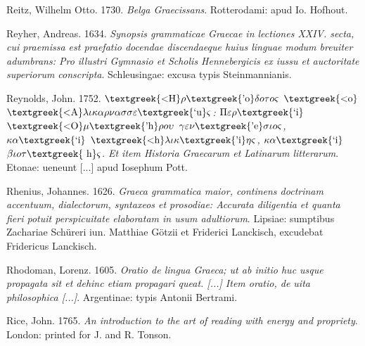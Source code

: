 \begin{styleStandard}
Reitz, Wilhelm Otto. 1730. \textit{Belga Graecissans}. Rotterodami: apud Io. Hofhout.
\end{styleStandard}

\begin{styleStandard}
Reyher, Andreas. 1634. \textit{Synopsis grammaticae Graecae in lectiones XXIV. secta, cui praemissa est praefatio docendae discendaeque huius linguae modum breuiter adumbrans: Pro illustri Gymnasio et Scholis Hennebergicis ex iussu et auctoritate superiorum conscripta}. Schleusingae: excusa typis Steinmannianis.
\end{styleStandard}

\begin{styleStandard}
Reynolds, John. 1752. \textit{$\text{\textgreek{<H}}\rho \text{\textgreek{'o}}\delta o\tau o\varsigma $ $\text{\textgreek{<o}}$ $\text{\textgreek{<A}}\lambda \iota \kappa \alpha \rho \nu \alpha \sigma \sigma \varepsilon \text{\textgreek{`u}}\varsigma $: $\Pi \varepsilon \rho \text{\textgreek{`i}}$ $\text{\textgreek{<O}}\mu \text{\textgreek{'h}}\rho o\upsilon $ $\gamma \varepsilon \nu \text{\textgreek{'e}}\sigma \iota o\varsigma $, $\kappa \alpha \text{\textgreek{`i}}$ $\text{\textgreek{<h}}\lambda \iota \kappa \text{\textgreek{'i}}\eta \varsigma $, $\kappa \alpha \text{\textgreek{`i}}$ $\beta \iota o\tau \text{\textgreek{~h}}\varsigma $. Et item Historia Graecarum et Latinarum litterarum}. Etonae: ueneunt [...] apud Iosephum Pott.
\end{styleStandard}

\begin{styleStandard}
Rhenius, Johannes. 1626. \textit{Graeca grammatica maior, continens doctrinam accentuum, dialectorum, syntaxeos et prosodiae: Accurata diligentia et quanta fieri potuit perspicuitate elaboratam in usum adultiorum}. Lipsiae: sumptibus Zachariae Schüreri iun. Matthiae Götzii et Friderici Lanckisch, excudebat Fridericus Lanckisch.
\end{styleStandard}

\begin{styleStandard}
Rhodoman, Lorenz. 1605. \textit{Oratio de lingua Graeca; ut ab initio huc usque propagata sit et dehinc etiam propagari queat. [...] Item oratio, de uita philosophica [...]}. Argentinae: typis Antonii Bertrami.
\end{styleStandard}

\begin{styleStandard}
Rice, John. 1765. \textit{An introduction to the art of reading with energy and propriety}. London: printed for J. and R. Tonson.
\end{styleStandard}

